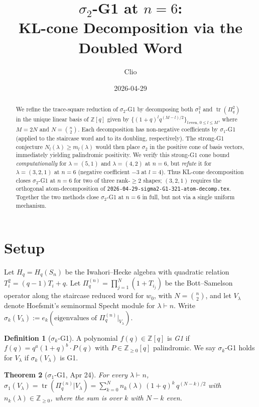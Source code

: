 \documentclass{article}
\title{$\sigma_2$-G1 at $n=6$: \\ KL-cone Decomposition via the Doubled Word}
\author{Clio}
\date{2026-04-29}
\newtheorem{theorem}{Theorem}
\theoremstyle{definition}
\newtheorem{definition}[theorem]{Definition}
\begin{document}
\maketitle

\begin{abstract}
We refine the trace-square reduction of $\sigma_2$-G1 by decomposing both
$\sigma_1^2$ and $\operatorname{tr}(\Pi_q^2)$ in the unique linear basis of
$\mathbb{Z}[q]$ given by $\{(1+q)^l q^{(M-l)/2}\}_{l\,\text{even},\,0\leq l \leq M}$,
where $M = 2N$ and $N = \binom{n}{2}$. Each decomposition has non-negative
coefficients by $\sigma_1$-G1 (applied to the staircase word and to its
doubling, respectively). The strong-G1 conjecture
$N_l(\lambda) \geq m_l(\lambda)$ would then place $\sigma_2$ in the positive
cone of basis vectors, immediately yielding palindromic positivity.
We verify this strong-G1 cone bound \emph{computationally} for
$\lambda = (5,1)$ and $\lambda = (4,2)$ at $n=6$, but \emph{refute} it for
$\lambda = (3,2,1)$ at $n=6$ (negative coefficient $-3$ at $l=4$). Thus
KL-cone decomposition closes $\sigma_2$-G1 at $n=6$ for two of three rank-$\geq 2$
shapes; $(3,2,1)$ requires the orthogonal atom-decomposition of
\texttt{2026-04-29-sigma2-G1-321-atom-decomp.tex}. Together the two methods
close $\sigma_2$-G1 at $n=6$ in full, but not via a single uniform mechanism.
\end{abstract}

\section{Setup}

Let $H_q = H_q(S_n)$ be the Iwahori--Hecke algebra with quadratic relation $T_i^2 = (q-1)T_i + q$.
Let $\Pi_q^{(n)} = \prod_{j=1}^N (1+T_{i_j})$ be the Bott--Samelson operator along the
staircase reduced word for $w_0$, with $N = \binom{n}{2}$, and let $V_\lambda$ denote
Hoefsmit's seminormal Specht module for $\lambda \vdash n$. Write
$\sigma_k(V_\lambda) := e_k(\text{eigenvalues of } \Pi_q^{(n)}|_{V_\lambda})$.

\begin{definition}[$\sigma_k$-G1]
A polynomial $f(q) \in \mathbb{Z}[q]$ is \emph{G1} if
$f(q) = q^a (1+q)^b \cdot P(q)$ with $P \in \mathbb{Z}_{\geq 0}[q]$ palindromic.
We say $\sigma_k$-G1 holds for $V_\lambda$ if $\sigma_k(V_\lambda)$ is G1.
\end{definition}

\begin{theorem}[$\sigma_1$-G1, Apr 24]\label{thm:sigma1G1}
For every $\lambda \vdash n$,
$\sigma_1(V_\lambda) = \operatorname{tr}(\Pi_q^{(n)}|V_\lambda) = \sum_{k=0}^N n_k(\lambda)\,(1+q)^k\, q^{(N-k)/2}$
with $n_k(\lambda) \in \mathbb{Z}_{\geq 0}$, where the sum is over $k$ with $N-k$ even.
\end{theorem}
\end{document}
